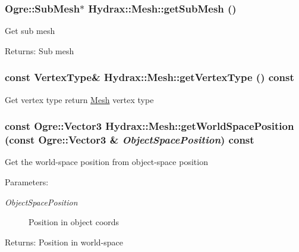 \begin{CompactItemize}
{\subsubsection[{getSubMesh}]{\setlength{\rightskip}{0pt plus 5cm}Ogre::SubMesh$\ast$ Hydrax::Mesh::getSubMesh ()}}
\label{class_hydrax_1_1_mesh_2eca9f2fe7879fd541163a5b21b17323}


Get sub mesh \begin{Desc}
\item[Returns:]Sub mesh \end{Desc}
\hypertarget{class_hydrax_1_1_mesh_8da15cd9f0865a0d7a06f899f5b302f5}{
\subsubsection[{getVertexType}]{\setlength{\rightskip}{0pt plus 5cm}const {\bf VertexType}\& Hydrax::Mesh::getVertexType () const}}
\label{class_hydrax_1_1_mesh_8da15cd9f0865a0d7a06f899f5b302f5}


Get vertex type return \hyperlink{class_hydrax_1_1_mesh}{Mesh} vertex type \hypertarget{class_hydrax_1_1_mesh_6b1be78ee3f7b3da03aee363025c76e7}{
\subsubsection[{getWorldSpacePosition}]{\setlength{\rightskip}{0pt plus 5cm}const Ogre::Vector3 Hydrax::Mesh::getWorldSpacePosition (const Ogre::Vector3 \& {\em ObjectSpacePosition}) const}}
\label{class_hydrax_1_1_mesh_6b1be78ee3f7b3da03aee363025c76e7}


Get the world-space position from object-space position \begin{Desc}
\item[Parameters:]
\begin{description}
\item[{\em ObjectSpacePosition}]Position in object coords \end{description}
\end{Desc}
\begin{Desc}
\item[Returns:]Position in world-space \end{Desc}
\hypertarget{class_hydrax_1_1_mesh_fb24883f62aa72204ed573693ff8bbf7}{
}
\end{CompactItemize}
